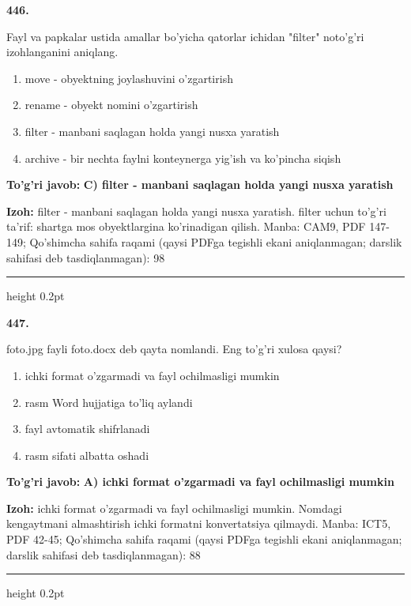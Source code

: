 \documentclass[10pt,a4paper]{article}
\begin{document}
{\bfseries\sffamily\color{ink} 446.}
\par
Fayl va papkalar ustida amallar bo'yicha qatorlar ichidan "filter" noto'g'ri izohlanganini aniqlang.
\begin{enumerate}[label=\Alph*),leftmargin=9mm]
\item move - obyektning joylashuvini o'zgartirish
\item rename - obyekt nomini o'zgartirish
\item filter - manbani saqlagan holda yangi nusxa yaratish
\item archive - bir nechta faylni konteynerga yig'ish va ko'pincha siqish
\end{enumerate}
\begin{tcolorbox}[enhanced,breakable,colback=teal!4,colframe=teal!60!black,boxrule=0.45pt,arc=1.2mm,left=2.7mm,right=2.7mm,top=1.8mm,bottom=1.8mm,before skip=2mm,after skip=2mm]
{\bfseries\sffamily\color{teal}To'g'ri javob:} \textbf{C) filter - manbani saqlagan holda yangi nusxa yaratish}
\par\smallskip
{\bfseries Izoh:} filter - manbani saqlagan holda yangi nusxa yaratish. filter uchun to'g'ri ta'rif: shartga mos obyektlargina ko'rinadigan qilish. Manba: CAM9, PDF 147-149; Qo'shimcha sahifa raqami (qaysi PDFga tegishli ekani aniqlanmagan; darslik sahifasi deb tasdiqlanmagan): 98
\end{tcolorbox}
\vspace{2mm}\hrule height 0.2pt\vspace{3mm}

{\bfseries\sffamily\color{ink} 447.}
\par
foto.jpg fayli foto.docx deb qayta nomlandi. Eng to'g'ri xulosa qaysi?
\begin{enumerate}[label=\Alph*),leftmargin=9mm]
\item ichki format o'zgarmadi va fayl ochilmasligi mumkin
\item rasm Word hujjatiga to'liq aylandi
\item fayl avtomatik shifrlanadi
\item rasm sifati albatta oshadi
\end{enumerate}
\begin{tcolorbox}[enhanced,breakable,colback=teal!4,colframe=teal!60!black,boxrule=0.45pt,arc=1.2mm,left=2.7mm,right=2.7mm,top=1.8mm,bottom=1.8mm,before skip=2mm,after skip=2mm]
{\bfseries\sffamily\color{teal}To'g'ri javob:} \textbf{A) ichki format o'zgarmadi va fayl ochilmasligi mumkin}
\par\smallskip
{\bfseries Izoh:} ichki format o'zgarmadi va fayl ochilmasligi mumkin. Nomdagi kengaytmani almashtirish ichki formatni konvertatsiya qilmaydi. Manba: ICT5, PDF 42-45; Qo'shimcha sahifa raqami (qaysi PDFga tegishli ekani aniqlanmagan; darslik sahifasi deb tasdiqlanmagan): 88
\end{tcolorbox}
\vspace{2mm}\hrule height 0.2pt\vspace{3mm}
\end{document}
